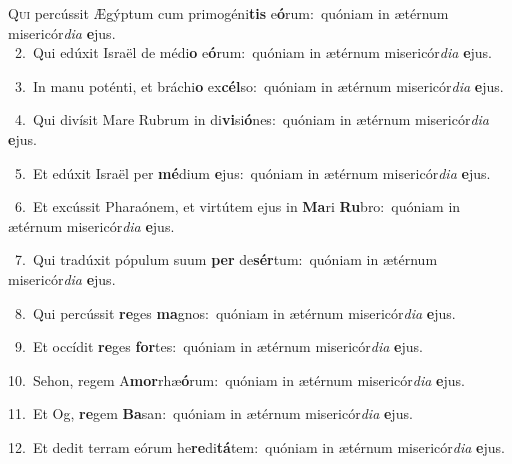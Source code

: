 \lettrine{\initial\textcolor{\initialcolor}{Q}}{ui} percússit Ægýptum cum primogéni\textbf{tis} e\-\textbf{ó}\-rum:~\star quóniam in ætérnum misericór\-\textit{di}\-\textit{a} \textbf{e}\-jus.\\
{\numbfont\textcolor{\numbcolor}{~2.}}~Qui edúxit Israël de médi\textbf{o} e\-\textbf{ó}\-rum:~\star quóniam in ætérnum misericór\-\textit{di}\-\textit{a} \textbf{e}\-jus.\par
{\numbfont\textcolor{\numbcolor}{~3.}}~In manu poténti, et bráchi\textbf{o} ex\-\textbf{cél}\-so:~\star quóniam in ætérnum misericór\-\textit{di}\-\textit{a} \textbf{e}\-jus.\par
{\numbfont\textcolor{\numbcolor}{~4.}}~Qui divísit Mare Rubrum in di\-\textbf{vi}\-si\-\textbf{ó}\-nes:~\star quóniam in ætérnum misericór\-\textit{di}\-\textit{a} \textbf{e}\-jus.\par
{\numbfont\textcolor{\numbcolor}{~5.}}~Et edúxit Israël per \textbf{mé}\-dium \textbf{e}\-jus:~\star quóniam in ætérnum misericór\-\textit{di}\-\textit{a} \textbf{e}\-jus.\par
{\numbfont\textcolor{\numbcolor}{~6.}}~Et excússit Pharaónem, et virtútem ejus in \textbf{Ma}\-ri \textbf{Ru}\-bro:~\star quóniam in ætérnum misericór\-\textit{di}\-\textit{a} \textbf{e}\-jus.\par
{\numbfont\textcolor{\numbcolor}{~7.}}~Qui tradúxit pópulum suum \textbf{per} de\-\textbf{sér}\-tum:~\star quóniam in ætérnum misericór\-\textit{di}\-\textit{a} \textbf{e}\-jus.\par
{\numbfont\textcolor{\numbcolor}{~8.}}~Qui percússit \textbf{re}\-ges \textbf{ma}\-gnos:~\star quóniam in ætérnum misericór\-\textit{di}\-\textit{a} \textbf{e}\-jus.\par
{\numbfont\textcolor{\numbcolor}{~9.}}~Et occídit \textbf{re}\-ges \textbf{for}\-tes:~\star quóniam in ætérnum misericór\-\textit{di}\-\textit{a} \textbf{e}\-jus.\par
{\numbfont\textcolor{\numbcolor}{10.}}~Sehon, regem A\-\textbf{mor}\-rhæ\-\textbf{ó}\-rum:~\star quóniam in ætérnum misericór\-\textit{di}\-\textit{a} \textbf{e}\-jus.\par
{\numbfont\textcolor{\numbcolor}{11.}}~Et Og, \textbf{re}\-gem \textbf{Ba}\-san:~\star quóniam in ætérnum misericór\-\textit{di}\-\textit{a} \textbf{e}\-jus.\par
{\numbfont\textcolor{\numbcolor}{12.}}~Et dedit terram eórum he\-\textbf{re}\-di\-\textbf{tá}\-tem:~\star quóniam in ætérnum misericór\-\textit{di}\-\textit{a} \textbf{e}\-jus.\par
